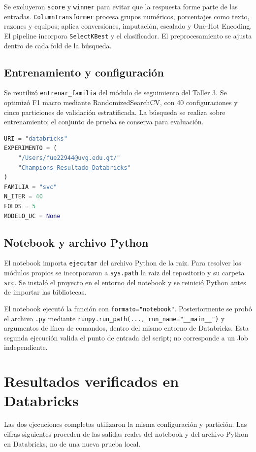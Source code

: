 \documentclass[12pt,a4paper]{article}
\begin{document}
Se excluyeron \texttt{score} y \texttt{winner} para evitar que la respuesta forme parte de las entradas. \texttt{ColumnTransformer} procesa grupos numéricos, porcentajes como texto, razones y equipos; aplica conversiones, imputación, escalado y One-Hot Encoding. El pipeline incorpora \texttt{SelectKBest} y el clasificador. El preprocesamiento se ajusta dentro de cada fold de la búsqueda.

\subsection{Entrenamiento y configuración}
Se reutilizó \texttt{entrenar\_familia} del módulo de seguimiento del Taller 3. Se optimizó F1 macro mediante RandomizedSearchCV, con 40 configuraciones y cinco particiones de validación estratificada. La búsqueda se realiza sobre entrenamiento; el conjunto de prueba se conserva para evaluación.

\begin{lstlisting}[language=Python]
URI = "databricks"
EXPERIMENTO = (
    "/Users/fue22944@uvg.edu.gt/"
    "Champions_Resultado_Databricks"
)
FAMILIA = "svc"
N_ITER = 40
FOLDS = 5
MODELO_UC = None
\end{lstlisting}

\subsection{Notebook y archivo Python}
El notebook importa \texttt{ejecutar} del archivo Python de la raiz. Para resolver los módulos propios se incorporaron a \texttt{sys.path} la raiz del repositorio y su carpeta \texttt{src}. Se instaló el proyecto en el entorno del notebook y se reinició Python antes de importar las bibliotecas.

El notebook ejecutó la función con \texttt{formato="notebook"}. Posteriormente se probó el archivo \texttt{.py} mediante \texttt{runpy.run\_path(..., run\_name="\_\_main\_\_")} y argumentos de línea de comandos, dentro del mismo entorno de Databricks. Esta segunda ejecución valida el punto de entrada del script; no corresponde a un Job independiente.

\newpage
\section{Resultados verificados en Databricks}
Las dos ejecuciones completas utilizaron la misma configuración y partición. Las cifras siguientes proceden de las salidas reales del notebook y del archivo Python en Databricks, no de una nueva prueba local.
\end{document}
